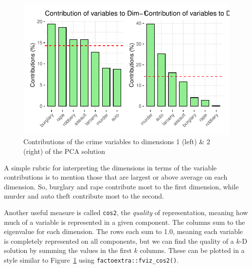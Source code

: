 \documentclass[
  letterpaper,
  10pt,
  krantz2]{krantz}
\begin{document}
\begin{figure}[H]

{\centering \includegraphics[width=1\textwidth,height=\textheight]{figs/ch04/fig-fviz-contrib-1.pdf}

}

\caption{\label{fig-fviz-contrib}Contributions of the crime variables to
dimensions 1 (left) \& 2 (right) of the PCA solution}

\end{figure}

A simple rubric for interpreting the dimensions in terms of the variable
contributions is to mention those that are largest or above average on
each dimension. So, burglary and rape contribute most to the first
dimension, while murder and auto theft contribute most to the second.

Another useful measure is called \texttt{cos2}, the \emph{quality} of
representation, meaning how much of a variable is represented in a given
component. The columns sum to the eigenvalue for each dimension. The
rows each sum to 1.0, meaning each variable is completely represented on
all components, but we can find the quality of a \(k\)-D solution by
summing the values in the first \(k\) columns. These can be plotted in a
style similar to Figure~\ref{fig-fviz-contrib} using
\texttt{factoextra::fviz\_cos2()}.
\end{document}
